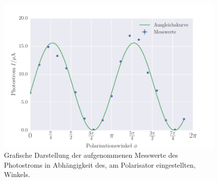 \begin{figure}[!h]
 \centering
 \includegraphics[scale=0.75]{../Grafiken/Polarisation.pdf}
 \caption{Grafische Darstellung der aufgenommenen Messwerte des Photostroms in Abhängigkeit des, am Polarisator eingestellten, Winkels.\label{fig:polarisation}}
 \end{figure} 